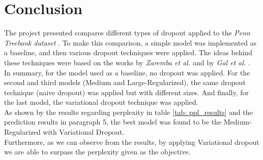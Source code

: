 \documentclass[a4paper]{article}
\begin{document}
\section{Conclusion}
The project presented compares different types of dropout applied to the \textit{Penn Treebank dataset} \cite{marcus-etal-ptb}. To make this comparison, a simple model was implemented as a baseline, and then various dropout techniques were applied. The ideas behind these techniques were based on the works by \textit{Zaremba et al.} \cite{zaremba-rnn} and by \textit{Gal et al.} \cite{gal-dropout}.
\\
In summary, for the model used as a baseline, no dropout was applied. For the second and third models (Medium and Large-Regularized), the same dropout technique (naive dropout) was applied but with different sizes. And finally, for the last model, the variational dropout technique was applied.
\\
As shown by the results regarding perplexity in table \ref{tab: ppl_results} and the prediction results in paragraph 5, the best model was found to be the Medium-Regularized with Variational Dropout.
\\
Furthermore, as we can observe from the results, by applying Variational dropout we are able to surpass the perplexity given as the objective.





\end{document}
